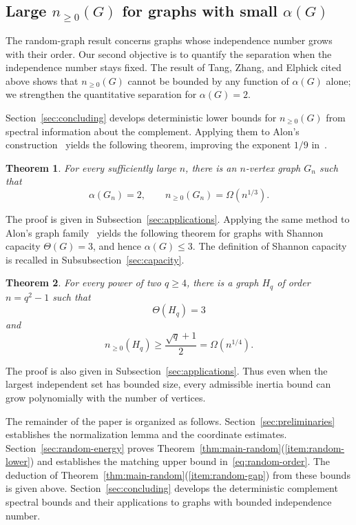 \documentclass[11pt]{article}
\numberwithin{equation}{section}
\newtheorem{theorem}{Theorem}[section]
\theoremstyle{definition}
\theoremstyle{remark}
\begin{document}
\subsection{Large \texorpdfstring{$n_{\geq0}(G)$}{n>=0(G)} for graphs with small \texorpdfstring{$\alpha(G)$}{alpha(G)}}

The random-graph result concerns graphs whose independence number
grows with their order. Our second objective is to quantify the
separation when the independence number stays fixed. The result of
Tang, Zhang, and Elphick cited above shows that
$n_{\geq0}(G)$ cannot be bounded by any function of $\alpha(G)$ alone;
we strengthen the quantitative separation for $\alpha(G)=2$.

Section~\ref{sec:concluding} develops deterministic lower bounds
for $n_{\geq0}(G)$ from spectral information about the complement.
Applying them to Alon's construction~\cite{Alon1994} yields the
following theorem, improving the exponent $1/9$
in~\cite[Theorem~1.2]{TZE}.

\begin{theorem}\label{thm:alpha-two}
For every sufficiently large $n$, there is an $n$-vertex
graph $G_n$ such that
\[
 \alpha(G_n)=2,\qquad
 n_{\geq0}(G_n)=\Omega(n^{1/3}).
\]
\end{theorem}

The proof is given in Subsection~\ref{sec:applications}.
Applying the same method to Alon's graph family~\cite{Alon2019}
yields the following theorem for graphs with Shannon capacity
$\Theta(G)=3$, and hence $\alpha(G)\leq3$.
The definition of Shannon capacity is recalled in
Subsubsection~\ref{sec:capacity}.

\begin{theorem}\label{thm:capacity}
For every power of two $q\geq4$, there is a graph $H_q$
of order $n=q^2-1$ such that
\[
 \Theta(H_q)=3
\]
and
\begin{equation}\label{eq:capacity-inertia}
 n_{\geq0}(H_q)\geq
 \frac{\sqrt q+1}{2}
 =\Omega(n^{1/4}).
\end{equation}
\end{theorem}

The proof is also given in Subsection~\ref{sec:applications}.
Thus even when the largest independent set has bounded size,
every admissible inertia bound can grow polynomially with the
number of vertices.

The remainder of the paper is organized as follows.
Section~\ref{sec:preliminaries} establishes the normalization
lemma and the coordinate estimates.
Section~\ref{sec:random-energy} proves
Theorem~\ref{thm:main-random}(\ref{item:random-lower}) and establishes
the matching upper bound in~\eqref{eq:random-order}.
The deduction of Theorem~\ref{thm:main-random}(\ref{item:random-gap})
from these bounds is given above.
Section~\ref{sec:concluding} develops the deterministic
complement spectral bounds and their applications to graphs with
bounded independence number.
\end{document}
